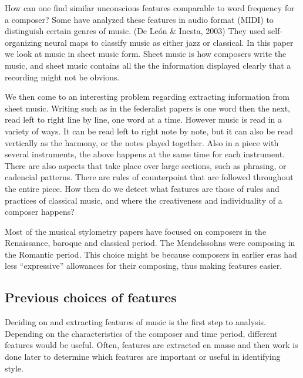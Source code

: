\documentclass[12pt,twoside]{reedthesis}
\theoremstyle{definition}
\theoremstyle{definition}
\theoremstyle{definition}
\theoremstyle{remark}
\begin{document}
How can one find similar unconscious features comparable to word
frequency for a composer? Some have analyzed these features in audio
format (MIDI) to distinguish certain genres of music. (De León \&
Inesta, 2003) They used self-organizing neural maps to classify music as
either jazz or classical. In this paper we look at music in sheet music
form. Sheet music is how composers write the music, and sheet music
contains all the the information displayed clearly that a recording
might not be obvious.

We then come to an interesting problem regarding extracting information
from sheet music. Writing such as in the federalist papers is one word
then the next, read left to right line by line, one word at a time.
However music is read in a variety of ways. It can be read left to right
note by note, but it can also be read vertically as the harmony, or the
notes played together. Also in a piece with several instruments, the
above happens at the same time for each instrument. There are also
aspects that take place over large sections, such as phrasing, or
cadencial patterns. There are rules of counterpoint that are followed
throughout the entire piece. How then do we detect what features are
those of rules and practices of classical music, and where the
creativeness and individuality of a composer happens?

Most of the musical stylometry papers have focused on composers in the
Renaissance, baroque and classical period. The Mendelssohns were
composing in the Romantic period. This choice might be because composers
in earlier eras had less ``expressive'' allowances for their composing,
thus making features easier.

\subsection{Previous choices of
features}\label{previous-choices-of-features}

Deciding on and extracting features of music is the first step to
analysis. Depending on the characteristics of the composer and time
period, different features would be useful. Often, features are
extracted en masse and then work is done later to determine which
features are important or useful in identifying style.
\end{document}

